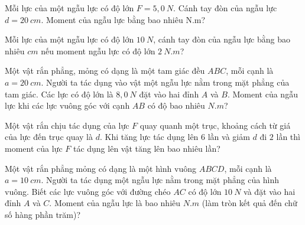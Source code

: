 \begin{ex}%
Mỗi lực của một ngẫu lực có độ lớn $F=5,0\ N$. Cánh tay đòn của ngẫu lực $d=20\ cm$. Moment của ngẫu lực bằng bao nhiêu N.m?
\loigiai{
}
\end{ex}
\begin{ex}%
Mỗi lực của một ngẫu lực có độ lớn $10\ N$, cánh tay đòn của ngẫu lực bằng bao nhiêu $cm$ nếu moment ngẫu lực có độ lớn $2\ N.m$?
\loigiai{}
\end{ex}
\begin{ex}%
Một vật rắn phẳng, mỏng có dạng là một tam giác đều $ABC$, mỗi cạnh là $a = 20\ cm$. Người ta tác dụng vào vật một ngẫu lực nằm trong mặt phẳng của tam giác. Các lực có độ lớn là $8,0\ N$ đặt vào hai đỉnh $A$ và $B$. Moment của ngẫu lực khi các lực vuông góc với cạnh $AB$ có độ bao nhiêu $N.m$?
		
\end{ex}
\begin{ex}%
Một vật rắn chịu tác dụng của lực $F$ quay quanh một trục, khoảng cách từ giá của lực đến trục quay là $d$. Khi tăng lực tác dụng lên  $6$ lần và giảm $d$ đi $2$ lần thì moment của lực $F$ tác dụng lên vật tăng lên bao nhiêu lần?
\loigiai{}
\end{ex}
\begin{ex}
Một vật rắn phẳng mỏng có dạng là một hình vuông $ABCD$, mỗi cạnh là $a=10\ cm$. Người ta tác dụng một ngẫu lực nằm trong mặt phẳng của hình vuông. Biết các lực vuông góc với đường chéo $AC$ có độ lớn $10\ N$ và đặt vào hai đỉnh $A$ và $C$. Moment của ngẫu lực là bao nhiêu $N.m$ (làm tròn kết quả đến chữ số hàng phần trăm)?
\loigiai{}
\end{ex}




